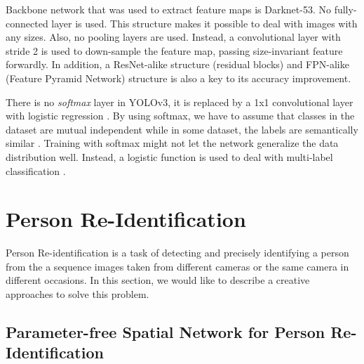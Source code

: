  Backbone network that was used to extract feature maps is Darknet-53\cite{yolov3}. 
 No fully-connected layer is used. This structure makes it possible to deal with images with
 any sizes. Also, no pooling layers are used\cite{yolov3}. Instead, a convolutional layer with stride 2 is used
 to down-sample the feature map, passing size-invariant feature forwardly.  In addition, a
 ResNet\cite{He_2016_CVPR}-alike structure (residual blocks) and FPN\cite{Lin_2017_CVPR}-alike (Feature Pyramid Network) structure is also
 a key to its accuracy improvement. \par There is no \textit{softmax} layer in YOLOv3, it is
 replaced by a 1x1 convolutional layer with logistic regression \cite{yolov3}. By using softmax, we have to
 assume that classes in the dataset are mutual independent while in some dataset, the labels are
 semantically similar \cite{yolov3}. Training with softmax might not let the network generalize the data
 distribution well. Instead, a logistic function is used to deal with multi-label classification \cite{yolov3}.

\section{Person Re-Identification}
\hspace{0.45cm}Person Re-identification is a task of detecting and precisely identifying a person from the a sequence images taken from different cameras or the same camera in different occasions. In this section, we would like to describe a creative approaches to solve this problem.
\subsection{Parameter-free Spatial Network for Person Re-Identification}

